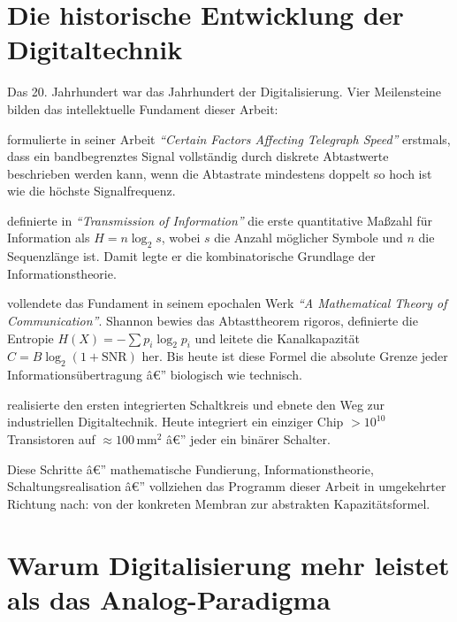 ﻿\documentclass[12pt,a4paper,titlepage]{report}
\begin{document}
\section{Die historische Entwicklung der Digitaltechnik}

Das 20. Jahrhundert war das Jahrhundert der Digitalisierung.
Vier Meilensteine bilden das intellektuelle Fundament dieser Arbeit:

\begin{description}[leftmargin=3em, style=nextline]
	\item[1924 â€” Harry Nyquist]
		formulierte in seiner Arbeit \emph{``Certain Factors Affecting
		Telegraph Speed''} erstmals, dass ein bandbegrenztes Signal
		vollständig durch diskrete Abtastwerte beschrieben werden kann,
		wenn die Abtastrate mindestens doppelt so hoch ist wie die
		höchste Signalfrequenz.
	\item[1928 â€” Ralph Hartley]
		definierte in \emph{``Transmission of Information''} die erste
		quantitative Maßzahl für Information als
		$H = n \log_2 s$,
		wobei $s$ die Anzahl möglicher Symbole und $n$ die Sequenzlänge ist.
		Damit legte er die kombinatorische Grundlage der Informationstheorie.
	\item[1948 â€” Claude E. Shannon]
		vollendete das Fundament in seinem epochalen Werk
		\emph{``A Mathematical Theory of Communication''}.
		Shannon bewies das Abtasttheorem rigoros,
		definierte die Entropie
		$H(X) = -\sum p_i \log_2 p_i$
		und leitete die Kanalkapazität
		$C = B \log_2(1 + \mathrm{SNR})$
		her.
		Bis heute ist diese Formel die absolute Grenze jeder
		Informationsübertragung â€” biologisch wie technisch.
	\item[1958 â€” Jack Kilby]
		realisierte den ersten integrierten Schaltkreis und ebnete
		den Weg zur industriellen Digitaltechnik.
		Heute integriert ein einziger Chip $> 10^{10}$ Transistoren
		auf $\approx 100\,\mathrm{mm}^2$ â€”
		jeder ein binärer Schalter.
\end{description}

Diese Schritte â€” mathematische Fundierung, Informationstheorie,
Schaltungsrealisation â€” vollziehen das Programm dieser Arbeit
in umgekehrter Richtung nach: von der konkreten Membran
zur abstrakten Kapazitätsformel.

\section{Warum Digitalisierung mehr leistet als das Analog-Paradigma}
\end{document}
